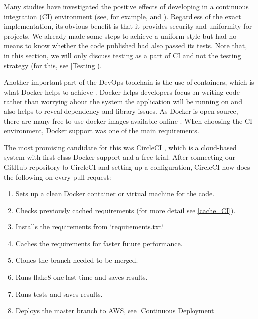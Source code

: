 \documentclass[main.tex]{subfiles}
\begin{document}
Many studies have investigated the positive effects of developing in a continuous integration (CI) environment (see, for example, \cite{CI_1} and \cite{CI_2}). Regardless of the exact implementation, its obvious benefit is that it provides security and uniformity for projects. We already made some steps to achieve a uniform style but had no means to know whether the code published had also passed its tests. Note that, in this section, we will only discuss testing as a part of CI and not the testing strategy (for this, see \ref{Testing}).

Another important part of the DevOps toolchain is the use of containers, which is what Docker helps to achieve \cite{Docker}. Docker helps developers focus on writing code rather than worrying about the system the application will be running on and also helps to reveal dependency and library issues. As Docker is open source, there are many free to use docker images available online \cite{DockerImages}. When choosing the CI environment, Docker support was one of the main requirements.

The most promising candidate for this was CircleCI \cite{CircleCI}, which is a cloud-based system with first-class Docker support and a free trial. After connecting our GitHub repository to CircleCI and setting up a configuration, CircleCI now does the following on every pull-request:

\begin{enumerate}
    \item Sets up a clean Docker container or virtual machine for the code.
    \item Checks previously cached requirements (for more detail see \figurename{\ref{cache_CI}}).
    \item Installs the requirements from `requirements.txt`
    \item Caches the requirements for faster future performance.
    \item Clones the branch needed to be merged.
    \item Runs flake8 one last time and saves results.
    \item Runs tests and saves results.
    \item Deploys the master branch to AWS, see \ref{Continuous Deployment}
\end{enumerate}
\end{document}
